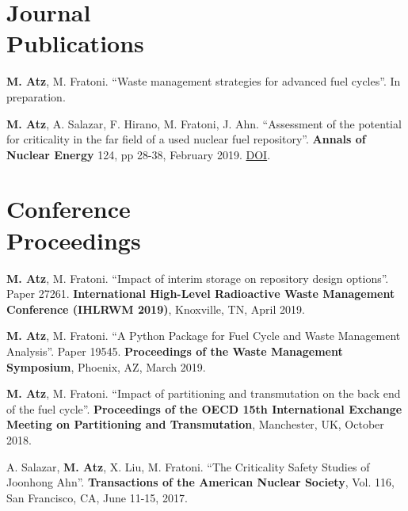 \documentclass[margin,line]{resume}
\begin{document}
\begin{resume}
\section{\mysidestyle Journal\\Publications}
\begin{bibenum}

    \item \textbf{M. Atz}, M. Fratoni. ``Waste management strategies for advanced fuel cycles''. In preparation.

    \item \textbf{M. Atz}, A. Salazar, F. Hirano, M. Fratoni, J. Ahn. ``Assessment of the potential for criticality in the far field of a used nuclear fuel repository''. \textbf{Annals of Nuclear Energy} 124, pp 28-38, February 2019. \href{https://doi.org/10.1016/j.anucene.2018.09.028}{DOI}.
    
\end{bibenum}
\section{\mysidestyle Conference\\Proceedings}
\begin{bibenum}

    \item \textbf{M. Atz}, M. Fratoni. ``Impact of interim storage on repository design options''. Paper 27261. \textbf{International High-Level Radioactive Waste Management Conference (IHLRWM 2019)}, Knoxville, TN, April 2019.
    
    \item \textbf{M. Atz}, M. Fratoni. ``A Python Package for Fuel Cycle and Waste Management Analysis''. Paper 19545. \textbf{Proceedings of the Waste Management Symposium}, Phoenix, AZ, March 2019.
    
    \item \textbf{M. Atz}, M. Fratoni. ``Impact of partitioning and transmutation on the back end of the fuel cycle''. \textbf{Proceedings of the OECD 15th International Exchange Meeting on Partitioning and Transmutation}, Manchester, UK, October 2018.
    
    \item A. Salazar, \textbf{M. Atz}, X. Liu, M. Fratoni. ``The Criticality Safety Studies of Joonhong Ahn''. \textbf{Transactions of the American Nuclear Society}, Vol. 116, San Francisco, CA, June 11-15, 2017.


\end{bibenum}
\end{resume}
\end{document}
